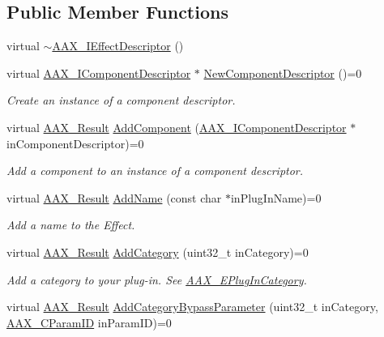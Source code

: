 \subsection*{Public Member Functions}
\begin{DoxyCompactItemize}
\item 
virtual \mbox{\hyperlink{a01813_a873d7fe13518d28081478912cfc1e311}{$\sim$\+A\+A\+X\+\_\+\+I\+Effect\+Descriptor}} ()
\item 
virtual \mbox{\hyperlink{a01781}{A\+A\+X\+\_\+\+I\+Component\+Descriptor}} $\ast$ \mbox{\hyperlink{a01813_a2102ea4391f5b60e4d5e860a997383e4}{New\+Component\+Descriptor}} ()=0
\begin{DoxyCompactList}\small\item\em Create an instance of a component descriptor. \end{DoxyCompactList}\item 
virtual \mbox{\hyperlink{a00392_a4d8f69a697df7f70c3a8e9b8ee130d2f}{A\+A\+X\+\_\+\+Result}} \mbox{\hyperlink{a01813_aec33938f50461dd5e7c1dcc25faf6917}{Add\+Component}} (\mbox{\hyperlink{a01781}{A\+A\+X\+\_\+\+I\+Component\+Descriptor}} $\ast$in\+Component\+Descriptor)=0
\begin{DoxyCompactList}\small\item\em Add a component to an instance of a component descriptor. \end{DoxyCompactList}\item 
virtual \mbox{\hyperlink{a00392_a4d8f69a697df7f70c3a8e9b8ee130d2f}{A\+A\+X\+\_\+\+Result}} \mbox{\hyperlink{a01813_a0d3a0e258050524ba6fbc354f16df207}{Add\+Name}} (const char $\ast$in\+Plug\+In\+Name)=0
\begin{DoxyCompactList}\small\item\em Add a name to the Effect. \end{DoxyCompactList}\item 
virtual \mbox{\hyperlink{a00392_a4d8f69a697df7f70c3a8e9b8ee130d2f}{A\+A\+X\+\_\+\+Result}} \mbox{\hyperlink{a01813_aeb6683e6758f7eb00f87c153e4809641}{Add\+Category}} (uint32\+\_\+t in\+Category)=0
\begin{DoxyCompactList}\small\item\em Add a category to your plug-\/in. See \mbox{\hyperlink{a00491_aef9637518fb1ac0e2f403444c73aba4a}{A\+A\+X\+\_\+\+E\+Plug\+In\+Category}}. \end{DoxyCompactList}\item 
virtual \mbox{\hyperlink{a00392_a4d8f69a697df7f70c3a8e9b8ee130d2f}{A\+A\+X\+\_\+\+Result}} \mbox{\hyperlink{a01813_a8da96a465f2bd367194067a51a12816d}{Add\+Category\+Bypass\+Parameter}} (uint32\+\_\+t in\+Category, \mbox{\hyperlink{a00392_a1440c756fe5cb158b78193b2fc1780d1}{A\+A\+X\+\_\+\+C\+Param\+ID}} in\+Param\+ID)=0

\end{DoxyCompactItemize}
